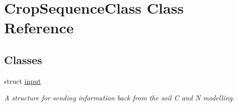 \hypertarget{class_crop_sequence_class}{}\section{Crop\+Sequence\+Class Class Reference}
\label{class_crop_sequence_class}
\subsection*{Classes}
\begin{DoxyCompactItemize}
\item 
struct \mbox{\hyperlink{struct_crop_sequence_class_1_1input}{input}}
\begin{DoxyCompactList}\small\item\em A structure for sending information back from the soil C and N modelling. \end{DoxyCompactList}\end{DoxyCompactItemize}
